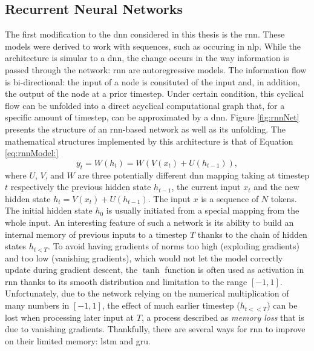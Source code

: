\subsection{Recurrent Neural Networks}\label{sec:RNN}
The first modification to the \gls{dnn} considered in this thesis is the \gls{rnn}. These models were derived to work with sequences, such as occuring in \gls{nlp}. While the architecture is simular to a \gls{dnn}, the change occurs in the way information is passed through the network: \gls{rnn} are autoregressive models. The information flow is bi-directional: the input of a node is consituted of the input and, in addition, the output of the node at a prior timestep. Under certain condition, this cyclical flow can be unfolded into a direct acyclical computational graph that, for a specific amount of timestep, can be approximated by a \gls{dnn}. Figure \ref{fig:rnnNet} presents the structure of an \gls{rnn}-based network as well as its unfolding. The mathematical structures implemented by this architecture is that of Equation \ref{eq:rnnModel:}
\begin{equation}\label{eq:rnnModel}
    y_t = W(h_t) = W(V(x_t) + U(h_{t-1})),
\end{equation}
where $U$, $V$, and $W$ are three potentially different \gls{dnn} mapping taking at timestep $t$ respectively the previous hidden state $h_{t-1}$, the current input $x_t$ and the new hidden state $h_t = V(x_t) + U(h_{t-1})$. The input $x$ is a sequence of $N$ tokens. The initial hidden state $h_0$ is usually initiated from a special mapping from the whole input. An interesting feature of such a network is its ability to build an internal memory of previous inputs to a timestep $T$ thanks to the chain of hidden states $h_{t<T}$. To avoid having gradients of norms too high (exploding gradients) and too low (vanishing gradients), which would not let the model correctly update during gradient descent, the $\tanh$ function is often used as activation in \gls{rnn} thanks to its smooth distribution and limitation to the range $[-1, 1]$. Unfortunately, due to the network relying on the numerical multiplication of many numbers in $[-1, 1]$, the effect of much earlier timestep ($h_{t<<T}$) can be lost when processing later input at $T$, a process described as \textit{memory loss} that is due to vanishing gradients. Thankfully, there are several ways for \gls{rnn} to improve on their limited memory: \gls{lstm} and \gls{gru}.

